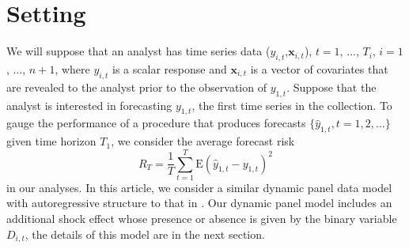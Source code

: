 \documentclass[11pt]{article}
\newcommand{\x}{\textbf{x}}
\def\E#1{\mathrm{E}(#1)} %
\theoremstyle{definition}
\begin{document}



\section{Setting}
\label{setting}
We will suppose that an analyst has time series data ($y_{i,t}$,$\x_{i,t}$), 
$t = 1$, $\ldots$, $T_i$, $i = 1$, $\ldots$, $n+1$, where $y_{i,t}$ is a 
scalar response and $\x_{i,t}$ is a vector of covariates that are revealed to 
the analyst prior to the observation of $y_{1,t}$.  Suppose that the analyst 
is interested in forecasting $y_{1,t}$, the first time series in the 
collection.
To gauge the performance of a procedure that produces forecasts 
$\{\hat y_{1,t}, t= 1,2,\ldots\}$ given time horizon $T_1$, we consider the 
average forecast risk
$$
  R_T = \frac{1}{T}\sum_{t=1}^T\E{\hat y_{1,t} - y_{1,t}}^2
$$
in our analyses. In this article, we consider a similar dynamic panel data 
model with autoregressive structure to that in \citet{blundell1998initial}. 
Our dynamic panel model includes an additional shock effect whose presence 
or absence is given by the binary variable $D_{i,t}$, the details of this model 
are in the next section.
\end{document}
